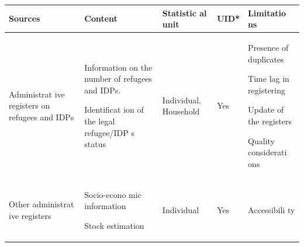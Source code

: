 \documentclass[
]{article}
\begin{document}
\begin{longtable}[]{@{}lllll@{}}
\toprule
\begin{minipage}[b]{0.17\columnwidth}\raggedright
\textbf{Sources}\strut
\end{minipage} & \begin{minipage}[b]{0.17\columnwidth}\raggedright
\textbf{Content}\strut
\end{minipage} & \begin{minipage}[b]{0.17\columnwidth}\raggedright
\textbf{Statistic
al
unit}\strut
\end{minipage} & \begin{minipage}[b]{0.17\columnwidth}\raggedright
\textbf{UID*}\strut
\end{minipage} & \begin{minipage}[b]{0.17\columnwidth}\raggedright
\textbf{Limitatio
ns}\strut
\end{minipage}\tabularnewline
\midrule
\endhead
\begin{minipage}[t]{0.17\columnwidth}\raggedright
Administrat
ive
registers
on refugees
and IDPs\strut
\end{minipage} & \begin{minipage}[t]{0.17\columnwidth}\raggedright
Information
on the
number of
refugees
and IDPs.

Identificat
ion
of the
legal
refugee/IDP
s
status\strut
\end{minipage} & \begin{minipage}[t]{0.17\columnwidth}\raggedright
Individual,
Household\strut
\end{minipage} & \begin{minipage}[t]{0.17\columnwidth}\raggedright
Yes\strut
\end{minipage} & \begin{minipage}[t]{0.17\columnwidth}\raggedright
Presence of
duplicates

Time lag in
registering

Update of
the
registers

Quality
considerati
ons\strut
\end{minipage}\tabularnewline
\begin{minipage}[t]{0.17\columnwidth}\raggedright
Other
administrat
ive
registers\strut
\end{minipage} & \begin{minipage}[t]{0.17\columnwidth}\raggedright
Socio-econo
mic
information

Stock
estimation\strut
\end{minipage} & \begin{minipage}[t]{0.17\columnwidth}\raggedright
Individual\strut
\end{minipage} & \begin{minipage}[t]{0.17\columnwidth}\raggedright
Yes\strut
\end{minipage} & \begin{minipage}[t]{0.17\columnwidth}\raggedright
Accessibili
ty


\end{minipage}
\end{longtable}
\end{document}
